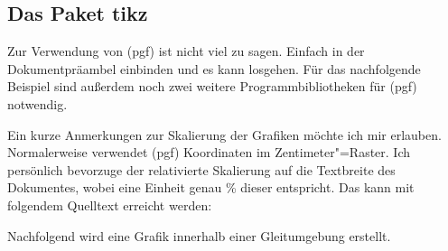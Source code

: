 \documentclass[%
  english,ngerman,%
  geometry=no,DIV=12,automark,%
]{tudscrartcl}
\begin{document}
\subsection{Das Paket tikz}
Zur Verwendung von (pgf) ist nicht viel zu sagen. Einfach in der 
Dokumentpräambel einbinden und es kann losgehen. Für das nachfolgende Beispiel 
sind außerdem noch zwei weitere Programmbibliotheken für (pgf) 
notwendig.
%
\begin{Hint*}
\usepackage{tikz}
\usetikzlibrary{chains}
\usetikzlibrary{decorations.markings}
\tikzset{on grid}
\end{Hint*}
%
Ein kurze Anmerkungen zur Skalierung der Grafiken möchte ich mir erlauben. 
Normalerweise verwendet (pgf) Koordinaten im Zentimeter"=Raster. 
Ich persönlich bevorzuge der relativierte Skalierung auf die Textbreite des 
Dokumentes, wobei eine Einheit genau \unit[1]{\%} dieser entspricht. Das kann 
mit folgendem Quelltext erreicht werden:
%
\InputHook{\renewcommand\newlength[1]{}}
\begin{Hint}
\newlength{\tikzunit}
\setlength{\tikzunit}{.01\textwidth}
\tikzset{x=\tikzunit,y=\tikzunit}
\end{Hint}
%
Nachfolgend wird eine Grafik innerhalb einer Gleitumgebung erstellt.
%
\end{document}
